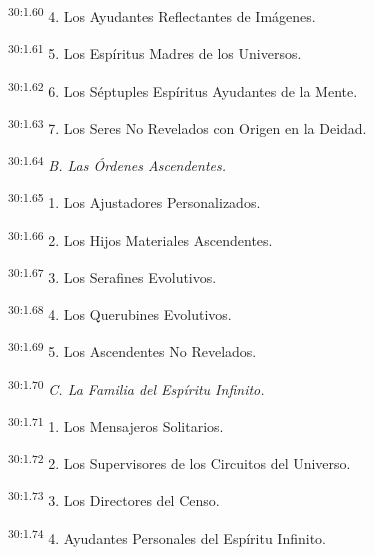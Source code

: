 \par
\textsuperscript{30:1.60} 4. Los Ayudantes Reflectantes de Imágenes.

\par
\textsuperscript{30:1.61} 5. Los Espíritus Madres de los Universos.

\par
\textsuperscript{30:1.62} 6. Los Séptuples Espíritus Ayudantes de la Mente.

\par
\textsuperscript{30:1.63} 7. Los Seres No Revelados con Origen en la Deidad.

\par
\textsuperscript{30:1.64} \textit{B. Las Órdenes Ascendentes.}

\par
\textsuperscript{30:1.65} 1. Los Ajustadores Personalizados.

\par
\textsuperscript{30:1.66} 2. Los Hijos Materiales Ascendentes.

\par
\textsuperscript{30:1.67} 3. Los Serafines Evolutivos.

\par
\textsuperscript{30:1.68} 4. Los Querubines Evolutivos.

\par
\textsuperscript{30:1.69} 5. Los Ascendentes No Revelados.

\par
\textsuperscript{30:1.70} \textit{C. La Familia del Espíritu Infinito.}

\par
\textsuperscript{30:1.71} 1. Los Mensajeros Solitarios.

\par
\textsuperscript{30:1.72} 2. Los Supervisores de los Circuitos del Universo.

\par
\textsuperscript{30:1.73} 3. Los Directores del Censo.

\par
\textsuperscript{30:1.74} 4. Ayudantes Personales del Espíritu Infinito.

